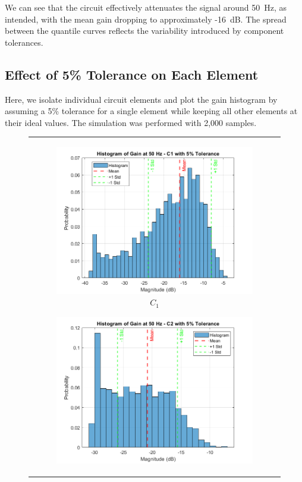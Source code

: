 \documentclass[hidelinks,12pt]{article}
\begin{document}
	We can see that the circuit effectively attenuates the signal around 50~Hz, as intended, with the mean gain dropping to approximately -16~dB. The spread between the quantile curves reflects the variability introduced by component tolerances.
	
	\pagebreak
	
	
	\subsection{Effect of 5\% Tolerance on Each Element}
	Here, we isolate individual circuit elements and plot the gain histogram by assuming a 5\% tolerance for a single element while keeping all other elements at their ideal values. The simulation was performed with 2,000 samples.
	
	\begin{figure}[!h]
		\centering
			\begin{tabular}{c}
				\begin{subfigure}[t]{0.5\textwidth}
					\centering
					\includegraphics[width=\textwidth]{figures/5_percent/c1.png}
					\caption{$C_1$}
				\end{subfigure}
				\hfill
				\begin{subfigure}[t]{0.5\textwidth}
					\centering
					\includegraphics[width=\textwidth]{figures/5_percent/c2.png}

\end{subfigure}
\end{tabular}
\end{figure}
\end{document}
